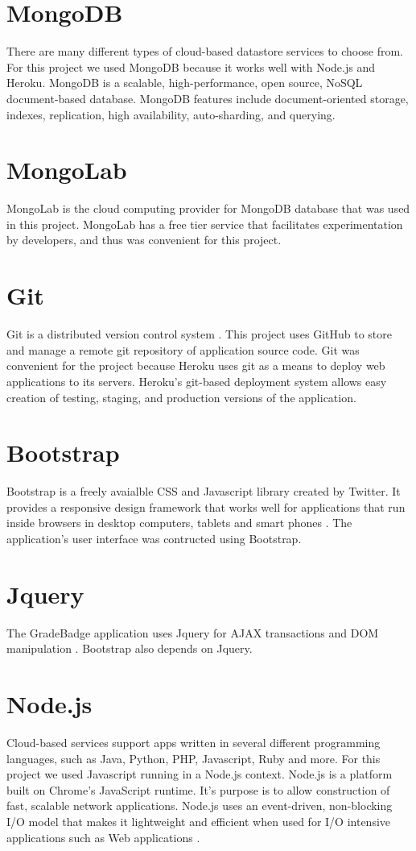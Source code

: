 \section{MongoDB}
There are many different types of cloud-based datastore services to choose from. For this project we used MongoDB because it works well with Node.js and Heroku.  MongoDB is a scalable, high-performance, open source, NoSQL document-based database. MongoDB features include document-oriented storage, indexes, replication, high availability, auto-sharding, and querying. \cite{mongodb}

\section{MongoLab}
MongoLab is the cloud computing provider for MongoDB database that was used in this project.  MongoLab has a free tier service that facilitates experimentation by developers, and thus was convenient for this project. \cite{mongolab}

\section{Git}
Git is a distributed version control system \cite{github}.  This project uses GitHub to store and manage a remote git repository of application source code.  Git was convenient for the project because Heroku uses git as a means to deploy web applications to its servers. Heroku's git-based deployment system allows easy creation of testing, staging, and production versions of the application.

\section{Bootstrap}
Bootstrap is a freely avaialble CSS and Javascript library created by Twitter.  It provides a responsive design framework that works well for applications that run inside browsers in desktop computers, tablets and smart phones \cite{bootstrap}. The application's user interface was contructed using Bootstrap. 

\section{Jquery}
The GradeBadge application uses Jquery for AJAX transactions and DOM manipulation \cite{JQuery}.  Bootstrap also depends on Jquery.

\section{Node.js}
Cloud-based services support apps written in several different programming languages, such as Java, Python, PHP, Javascript, Ruby and more. For this project we used Javascript running in a Node.js context. Node.js is a platform built on Chrome's JavaScript runtime.  It's purpose is to allow construction of fast, scalable network applications. Node.js uses an event-driven, non-blocking I/O model that makes it lightweight and efficient when used for I/O intensive applications such as Web applications \cite{nodejs}.

